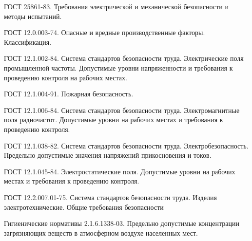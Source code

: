  ГОСТ 25861-83.
                                Требования электрической и механической
                                безопасности и методы испытаний.

   ГОСТ 12.0.003-74.
                                Опасные и вредные производственные факторы.
                                Классификация.

   ГОСТ 12.1.002-84.
                                Система стандартов безопасности труда.
                                Электрические поля промышленной частоты.
                                Допустимые уровни напряженности и требования
                                к проведению контроля на рабочих местах.

  ГОСТ 12.1.004-91.
                                    Пожарная безопасность.

   ГОСТ 12.1.006-84.
                                Система стандартов безопасности труда.
                                Электромагнитные поля радиочастот.
                                Допустимые уровни на рабочих местах и требования
                                к проведению контроля.

  ГОСТ 12.1.038-82.
                                    Система стандартов безопасности труда.
                                    Электробезопасность. Предельно допустимые
                                    значения напряжений прикосновения и токов.

   ГОСТ 12.1.045-84.
                                Электростатические поля. Допустимые уровни на
                                рабочих местах и требования к проведению контроля.

   ГОСТ 12.2.007.01-75.
                                        Система стандартов безопасности труда.
                                        Изделия электротехнические.
                                        Общие требования безопасности

  Гигиенические нормативы 2.1.6.1338-03.
                                        Предельно допустимые концентрации загрязняющих
                                        веществ в атмосферном воздухе населенных мест.
